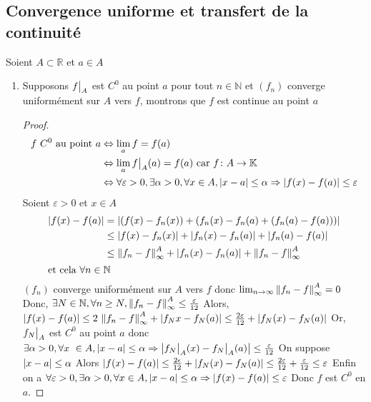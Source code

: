 \documentclass[11pt,hidelinks]{book}
\theoremstyle{mytheoremstyle}
\theoremstyle{mytheoremstyle}
\theoremstyle{mytheoremstyle}
\theoremstyle{mytheoremstyle}
\theoremstyle{mytheoremstyle}
\theoremstyle{mytheoremstyle}
\theoremstyle{mytheoremstyle}
\theoremstyle{mytheoremstyle}
\theoremstyle{myproblemstyle}
\def\mbb#1{\mathbb{#1}}
\def\bN{\mbb{N}}
\def\bR{\mbb{R}}
\def\bK{\mbb{K}}
\def\ln{\lim_{n \to \infty}}
\newcommand{\cvu}[2]{converge uniformément sur $#1$ vers $#2$}
\newcommand{\parenth}[1]{\left(#1\right)}
\newcommand\restr[2]{{%
  \left.\kern-\nulldelimiterspace %
  #1 %
  \vphantom{\big|} %
  \right|_{#2} %
  }}
\begin{document}
\subsection{Convergence uniforme et transfert de la continuité}
\begin{adjustwidth}{-2em}{-1em}
\begin{theorem}
    Soient $A \subset \bR$ et $a \in A$ 
    \begin{enumerate}
    \item Supposons $\restr{f}{A}$ est $C^0$ au point $a$ pour tout $n \in \bN$ 
    et $(f_n)$ \cvu{A}{f}, montrons que $f$ est continue au point $a$
    \begin{proof}
    \begin{align*}
        f \text{ } C^0 \text{ au point } a &\Leftrightarrow \lim_a f = f(a) \\
                                &\Leftrightarrow \lim_a \restr{f}{A}(a) = f(a) \text{ car } f\colon A \to \bK \\
                                &\Leftrightarrow \forall \varepsilon > 0, \exists \alpha > 0, \forall x \in A, \abs{x - a} \leq \alpha \Rightarrow \abs{f(x) - f(a)} \leq \varepsilon \\
        \end{align*}   
    Soient $\varepsilon > 0$ et $x \in A$ 
    \begin{align*}
        \abs{f(x) - f(a)} &= \abs{\parenth{f(x) - f_n(x)} + \parenth{f_n(x) - f_n(a) + \parenth{f_n(a) - f(a)}}} \\
                          &\leq \abs{f(x) - f_n(x)} + \abs{f_n(x) - f_n(a)} + \abs{f_n(a) - f(a)} \\
                          &\leq \norm{f_n - f}^{A}_{\infty} + \abs{f_n(x) - f_n(a)} + \norm{f_n - f}^{A}_{\infty} \\
                        \intertext{et cela $\forall n \in \bN$}
                        \end{align*}
        $(f_n)$ \cvu{A}{f} donc $\ln \norm{f_n - f}^{A}_{\infty} = 0$
        Donc, $\exists N \in \bN, \forall n \geq N, \norm{f_n - f}^{A}_{\infty} \leq \frac{\varepsilon}{12}$
        Alors, $\abs{f(x) - f(a)} \leq 2 \norm{f_n - f}^{A}_{\infty} + \abs{f_N{x} - f_N(a)} \leq \frac{2\varepsilon}{12} + \abs{f_N(x) - f_N(a)}$
        Or, $\restr{f_N}{A}$ est $C^0$ au point $a$ donc $\exists \alpha > 0, \forall x \in A, \abs{x -a} \leq \alpha \Rightarrow \abs{\restr{f_N}{A}(x) - \restr{f_N}{A}(a)} \leq \frac{\varepsilon}{12}$\newline
        On suppose $\abs{x-a} \leq \alpha$
        Alors $\abs{f(x) - f(a)} \leq \frac{2\epsilon}{12} + \abs{f_N(x) - f_N(a)} \leq \frac{2\varepsilon}{12} + \frac{\varepsilon}{12} \leq \varepsilon$
        Enfin on a $\forall \varepsilon > 0, \exists \alpha > 0, \forall x \in A, \abs{x-a} \leq \alpha \Rightarrow \abs{f(x) - f(a)} \leq \varepsilon$
        Donc $f$ est $C^0$ en $a$.
                    \end{proof} 



\end{enumerate}
\end{theorem}
\end{adjustwidth}
\end{document}
